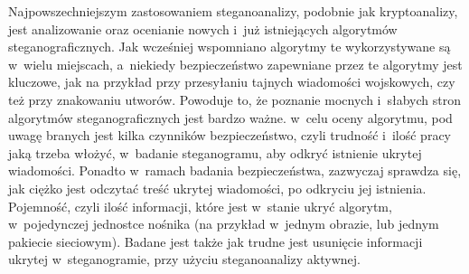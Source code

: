 \documentclass[a4paper, twoside, 12pt]{report}
\begin{document}
        Najpowszechniejszym zastosowaniem steganoanalizy, podobnie jak kryptoanalizy,
        jest analizowanie oraz ocenianie nowych i~już istniejących algorytmów steganograficznych.
        Jak wcześniej wspomniano algorytmy te wykorzystywane są w~wielu miejscach,
        a~niekiedy bezpieczeństwo zapewniane przez te algorytmy jest kluczowe, jak
        na przykład przy przesyłaniu tajnych wiadomości wojskowych, czy też przy znakowaniu
        utworów. Powoduje to, że poznanie mocnych i~słabych stron algorytmów steganograficznych
        jest bardzo ważne. w~celu oceny algorytmu, pod uwagę branych jest kilka czynników
        bezpieczeństwo, czyli trudność i~ilość pracy jaką trzeba włożyć,
        w~badanie steganogramu, aby odkryć istnienie ukrytej wiadomości.
        Ponadto w~ramach badania bezpieczeństwa, zazwyczaj sprawdza się, jak ciężko
        jest odczytać treść ukrytej wiadomości, po odkryciu jej istnienia.
        Pojemność, czyli
        ilość informacji, które jest w~stanie ukryć algorytm, w~pojedynczej jednostce
        nośnika (na przykład w~jednym obrazie, lub jednym pakiecie sieciowym). Badane
        jest także jak trudne jest usunięcie informacji ukrytej w~steganogramie, przy
        użyciu steganoanalizy aktywnej.
\end{document}
